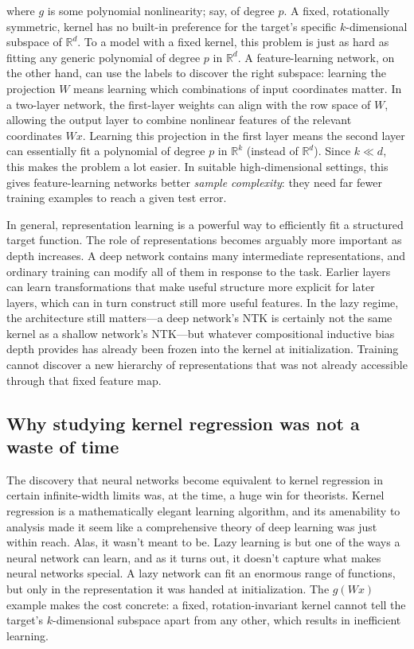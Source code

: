 where $g$ is some polynomial nonlinearity; say, of degree $p$. A fixed, rotationally symmetric, kernel has no built-in preference for the target's specific $k$-dimensional subspace of $\mathbb{R}^d$. To a model with a fixed kernel, this problem is just as hard as fitting any generic polynomial of degree $p$ in $\mathbb{R}^d$. A feature-learning network, on the other hand, can use the labels to discover the right subspace: learning the projection $W$ means learning which combinations of input coordinates matter. In a two-layer network, the first-layer weights can align with the row space of $W$, allowing the output layer to combine nonlinear features of the relevant coordinates $Wx$. Learning this projection in the first layer means the second layer can essentially fit a polynomial of degree $p$ in $\mathbb{R}^k$ (instead of $\mathbb{R}^d$). Since $k\ll d$, this makes the problem a lot easier. In suitable high-dimensional settings, this gives feature-learning networks better \textit{sample complexity}: they need far fewer training examples to reach a given test error.

In general, representation learning is a powerful way to efficiently fit a structured target function. The role of representations becomes arguably more important as depth increases. A deep network contains many intermediate representations, and ordinary training can modify all of them in response to the task. Earlier layers can learn transformations that make useful structure more explicit for later layers, which can in turn construct still more useful features. In the lazy regime, the architecture still matters---a deep network's NTK is certainly not the same kernel as a shallow network's NTK---but whatever compositional inductive bias depth provides has already been frozen into the kernel at initialization. Training cannot discover a new hierarchy of representations that was not already accessible through that fixed feature map.

\subsection{Why studying kernel regression was not a waste of time}

The discovery that neural networks become equivalent to kernel regression in certain infinite-width limits was, at the time, a huge win for theorists. Kernel regression is a mathematically elegant learning algorithm, and its amenability to analysis made it seem like a comprehensive theory of deep learning was just within reach. Alas, it wasn't meant to be. Lazy learning is but one of the ways a neural network can learn, and as it turns out, it doesn't capture what makes neural networks special. A lazy network can fit an enormous range of functions, but only in the representation it was handed at initialization. The $g(Wx)$ example makes the cost concrete: a fixed, rotation-invariant kernel cannot tell the target's $k$-dimensional subspace apart from any other, which results in inefficient learning.

